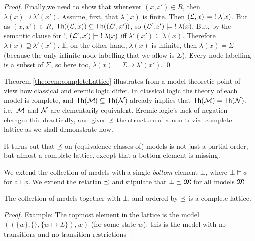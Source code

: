 \begin{proof}
Finally,we need to show that whenever $(x,x') \in R$, then $\lambda(x)
\supseteq \lambda'(x')$.  Assume, first, that $\lambda(x)$ is finite.
Then $(\mathcal{L}, x) \models \; ! \; \lambda(x)$.  But as $(x,x') \in R$,
$\mathsf{Th}((\mathcal{L}, x)) \subseteq \mathsf{Th}((\mathcal{L}', x')) $, so $(\mathcal{L}', x')
\models \; ! \; \lambda(x)$.  But, by the semantic clause for $!$,
$(\mathcal{L}', x') \models \; ! \; \lambda(x)$ iff $\lambda'(x') \subseteq
\lambda(x)$.  Therefore $\lambda(x) \supseteq \lambda'(x')$.  If, on
the other hand, $\lambda(x)$ is infinite, then $\lambda(x) = \Sigma$
(because the only infinite node labelling that we allow is
$\Sigma$). Every node labelling is a subset of $\Sigma$, so here too,
$\lambda(x) = \Sigma \supseteq \lambda'(x')$.  \qed
\end{proof}

\NI Theorem \ref{theorem:completeLattice} illustrates from a
model-theoretic point of view how classical and eremic logic
differ. In classical logic the theory of each model is complete, and
$\mathsf{Th}(\mathcal{M}) \subseteq \mathsf{Th}(\mathcal{N})$ already implies that
$\mathsf{Th}(\mathcal{M}) = \mathsf{Th}(\mathcal{N})$, i.e.~$\mathcal{M}$ and $\mathcal{N}$
are elementarily equivalent. Eremic logic's lack of negation changes
this drastically, and gives $\preceq$ the structure of a non-trivial
complete lattice as we shall demonstrate now.

It turns out that $\preceq $ on (equivalence classes of) models is
not just a partial order, but almost a complete lattice, except that a
bottom element is missing.

\begin{definition}
We extend the collection of models with a single \emph{bottom} element
$\bot$, where $\bot \models \phi$ for all $\phi$. 
We extend the relation $\preceq $  and stipulate that $\bot
\preceq \frak{M}$ for all models $\frak{M}$.
\end{definition}



\begin{theorem}
The collection of models together with $\bot$, and ordered by $\preceq $
is a complete lattice.  
\end{theorem}
\begin{proof}
  Example: The topmost element in the lattice is
the model $( (\{w\}, \{\}, \{w \mapsto \Sigma\}), w)$ (for some state
$w$): this is the model with no transitions and no transition
restrictions.
\end{proof}


